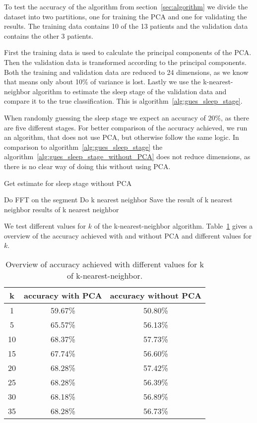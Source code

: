 To test the accuracy of the algorithm from section~\ref{sec:algorithm} we divide the dataset into two partitions, one for training the PCA and one for validating the results. The training data contains 10 of the 13 patients and the validation data contains the other 3 patients.

First the training data is used to calculate the principal components of the PCA. Then the validation data is transformed according to the principal components. Both the training and validation data are reduced to 24 dimensions, as we know that means only about 10\% of variance is lost. Lastly we use the k-nearest-neighbor algorithm to estimate the sleep stage of the validation data and compare it to the true classification. This is algorithm~\ref{alg:gues_sleep_stage}.

When randomly guessing the sleep stage we expect an accuracy of 20\%, as there are five different stages. For better comparison of the accuracy achieved, we run an algorithm, that does not use PCA, but otherwise follow the same logic. In comparison to algorithm~\ref{alg:gues_sleep_stage} the algorithm~\ref{alg:gues_sleep_stage_without_PCA} does not reduce dimensions, as there is no clear way of doing this without using PCA.

\begin{algorithm}
	\caption{Get estimate for sleep stage without PCA}\label{alg:gues_sleep_stage_without_PCA}
	\begin{algorithmic}
		\State Do FFT on the segment
		\State Do k nearest neighbor
		\State Save the result of k nearest neighbor
		\EndFor
		\State \Return results of k nearest neighbor
	\end{algorithmic}
\end{algorithm}

We test different values for $k$ of the k-nearest-neighbor algorithm. Table~\ref{tab:error_validation_overview} gives a overview of the accuracy achieved with and without PCA and different values for $k$.

\begin{table}
	\centering
	\begin{tabular}{c|c|c}
		k & accuracy with PCA & accuracy without PCA \\
		\hline
		1  & 59.67\% & 50.80\% \\
		5  & 65.57\% & 56.13\% \\
		10 & 68.37\% & 57.73\% \\
		15 & 67.74\% & 56.60\% \\
		20 & 68.28\% & 57.42\% \\
		25 & 68.28\% & 56.39\% \\
		30 & 68.18\% & 56.89\% \\
		35 & 68.28\% & 56.73\% \\
	\end{tabular}
	\caption{Overview of accuracy achieved with different values for k of k-nearest-neighbor.}
	\label{tab:error_validation_overview}
\end{table}

